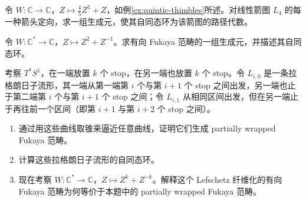 \begin{exercise}\label{exer:quintic-all-orientations}
令 $W\colon\mathbb C\to\mathbb C$，$Z\mapsto\frac45Z^5+Z$，如例\ref{ex:quintic-thimbles}所述。对线性箭图 $L_4$ 的每一种箭头定向，求一组生成元，使其自同态环为该箭图的路径代数。
\end{exercise}

\begin{exercise}\label{exer:z2-zminus1-generators}
令 $W\colon\mathbb C^*\to\mathbb C$，$Z\mapsto Z^2+Z^{-1}$。求有向 Fukaya 范畴的一组生成元，并描述其自同态环。
\end{exercise}

\begin{exercise}\label{exer:two-sided-stops}
考察 $T^*S^1$，在一端放置 $k$ 个 stop，在另一端也放置 $k$ 个 stop。令 $L_{i,0}$ 是一条拉格朗日子流形，其一端从第一端第 $i$ 个与第 $i+1$ 个 stop 之间出发，另一端也止于第二端第 $i$ 个与第 $i+1$ 个 stop 之间；令 $L_{i,1}$ 从相同区间出发，但在另一端止于再往前一个区间（即第 $i+1$ 与第 $i+2$ 个 stop 之间）。
\begin{enumerate}[label=(\roman*)]
  \item 通过用这些曲线取锥来逼近任意曲线，证明它们生成 partially wrapped Fukaya 范畴。
  \item 计算这些拉格朗日子流形的自同态环。
  \item 现在考察 $W\colon\mathbb C^*\to\mathbb C$，$Z\mapsto Z^k+Z^{-k}$。解释这个 Lefschetz 纤维化的有向 Fukaya 范畴为何等价于本题中的 partially wrapped Fukaya 范畴。
\end{enumerate}
\end{exercise}

